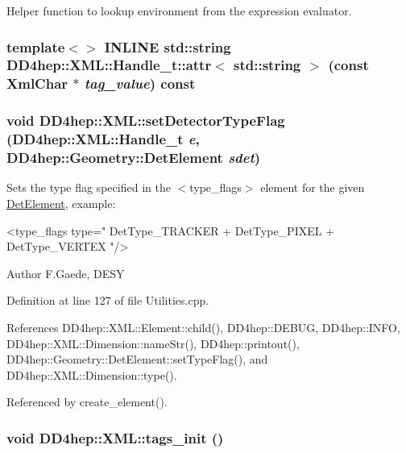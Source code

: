Helper function to lookup environment from the expression evaluator. \hypertarget{namespace_d_d4hep_1_1_x_m_l_aed0b0dbb044dd52812ef73a41436b635}{
\subsubsection[{Handle\_\-t::attr$<$ std::string $>$}]{\setlength{\rightskip}{0pt plus 5cm}template$<$$>$ INLINE std::string DD4hep::XML::Handle\_\-t::attr$<$ std::string $>$ (const XmlChar $\ast$ {\em tag\_\-value}) const}}
\label{namespace_d_d4hep_1_1_x_m_l_aed0b0dbb044dd52812ef73a41436b635}
\hypertarget{namespace_d_d4hep_1_1_x_m_l_ae5c379820b07798a4c0af10b83fd2ad0}{
\subsubsection[{setDetectorTypeFlag}]{\setlength{\rightskip}{0pt plus 5cm}void DD4hep::XML::setDetectorTypeFlag ({\bf DD4hep::XML::Handle\_\-t} {\em e}, \/  {\bf DD4hep::Geometry::DetElement} {\em sdet})}}
\label{namespace_d_d4hep_1_1_x_m_l_ae5c379820b07798a4c0af10b83fd2ad0}
Sets the type flag specified in the $<$type\_\-flags$>$ element for the given \hyperlink{struct_d_d4hep_1_1_x_m_l_1_1_det_element}{DetElement}, example: \par
 \begin{DoxyVerb}
	<type_flags type=" DetType_TRACKER + DetType_PIXEL + DetType_VERTEX "/>
	\end{DoxyVerb}
 \begin{DoxyAuthor}{Author}
F.Gaede, DESY 
\end{DoxyAuthor}


Definition at line 127 of file Utilities.cpp.

References DD4hep::XML::Element::child(), DD4hep::DEBUG, DD4hep::INFO, DD4hep::XML::Dimension::nameStr(), DD4hep::printout(), DD4hep::Geometry::DetElement::setTypeFlag(), and DD4hep::XML::Dimension::type().

Referenced by create\_\-element().\hypertarget{namespace_d_d4hep_1_1_x_m_l_af7aa83aefe34bc63c5dd562d27340edd}{
\subsubsection[{tags\_\-init}]{\setlength{\rightskip}{0pt plus 5cm}void DD4hep::XML::tags\_\-init ()}}
\label{namespace_d_d4hep_1_1_x_m_l_af7aa83aefe34bc63c5dd562d27340edd}


